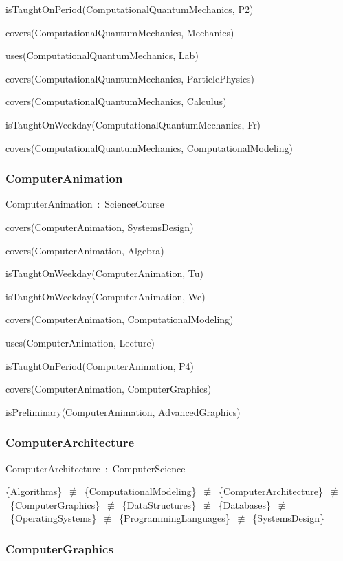\documentclass{article}
\begin{document}
isTaughtOnPeriod(ComputationalQuantumMechanics, P2)

covers(ComputationalQuantumMechanics, Mechanics)

uses(ComputationalQuantumMechanics, Lab)

covers(ComputationalQuantumMechanics, ParticlePhysics)

covers(ComputationalQuantumMechanics, Calculus)

isTaughtOnWeekday(ComputationalQuantumMechanics, Fr)

covers(ComputationalQuantumMechanics, ComputationalModeling)

\subsubsection*{ComputerAnimation}

ComputerAnimation~:~ScienceCourse

covers(ComputerAnimation, SystemsDesign)

covers(ComputerAnimation, Algebra)

isTaughtOnWeekday(ComputerAnimation, Tu)

isTaughtOnWeekday(ComputerAnimation, We)

covers(ComputerAnimation, ComputationalModeling)

uses(ComputerAnimation, Lecture)

isTaughtOnPeriod(ComputerAnimation, P4)

covers(ComputerAnimation, ComputerGraphics)

isPreliminary(ComputerAnimation, AdvancedGraphics)

\subsubsection*{ComputerArchitecture}

ComputerArchitecture~:~ComputerScience

\{Algorithms\}~\ensuremath{\not\equiv}~\{ComputationalModeling\}~\ensuremath{\not\equiv}~\{ComputerArchitecture\}~\ensuremath{\not\equiv}~\{ComputerGraphics\}~\ensuremath{\not\equiv}~\{DataStructures\}~\ensuremath{\not\equiv}~\{Databases\}~\ensuremath{\not\equiv}~\{OperatingSystems\}~\ensuremath{\not\equiv}~\{ProgrammingLanguages\}~\ensuremath{\not\equiv}~\{SystemsDesign\}

\subsubsection*{ComputerGraphics}
\end{document}
